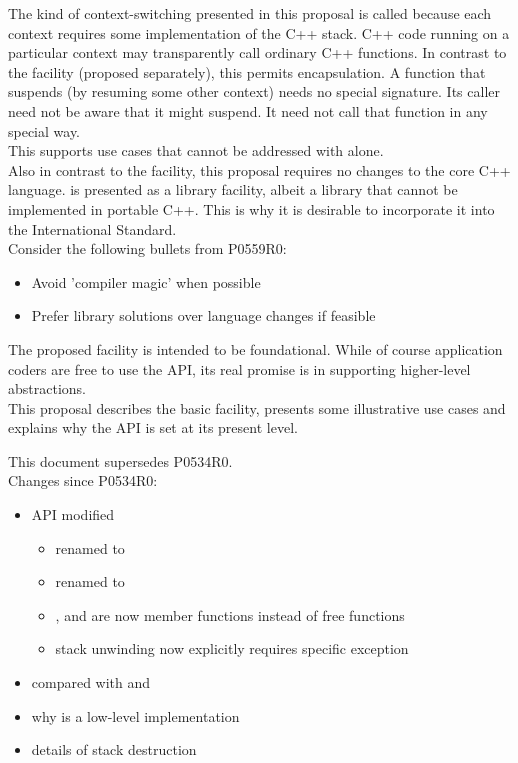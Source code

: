 \documentclass[fontsize=10pt,paper=A4,pagesize,DIV=15]{scrartcl}
\begin{document}
The kind of context-switching presented in this proposal is called
 because each context requires some implementation of the C++
stack. C++ code running on a particular context may transparently call
ordinary C++ functions. In contrast to the 
facility (proposed separately\cite{N4649}), this permits encapsulation. A
function that suspends (by resuming some other context) needs no special
signature. Its caller need not be aware that it might suspend. It need not
call that function in any special way.\\

This supports use cases that cannot be addressed with  alone.\\

Also in contrast to the  facility, this proposal requires no
changes to the core C++ language. \cc is presented as a library facility,
albeit a library that cannot be implemented in portable C++. This is why it is
desirable to incorporate it into the International Standard.\\

Consider the following bullets from P0559R0:\cite{P0559R0}

\begin{itemize}
\item Avoid 'compiler magic' when possible
\item Prefer library solutions over language changes if feasible
\end{itemize}

The proposed \cc facility is intended to be foundational. While of course
application coders are free to use the \cc API, its real promise is in
supporting higher-level abstractions.\\

This proposal describes the basic \cc facility, presents some illustrative use
cases and explains why the API is set at its present level.

This document supersedes P0534R0.\cite{P0534R0}\\
\newline
Changes since P0534R0:

\begin{itemize}
    \item API modified
    \begin{itemize}
        \item {} renamed to \resume
        \item {} renamed to \resumewith
        \item \dataavail, \getdata and \anythread are now member functions
          instead of free functions
        \item stack unwinding now explicitly requires specific  
              exception
    \end{itemize}
    \item \cc compared with \uc and \lj
    \item why \cc is a low-level implementation
    \item details of stack destruction
\end{itemize}
\end{document}
